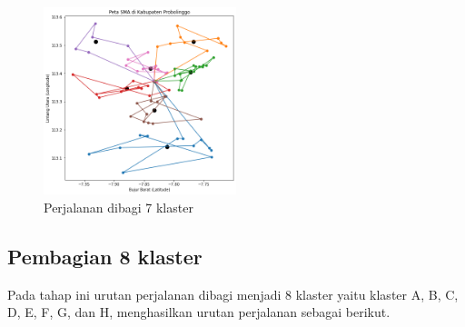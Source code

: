 \begin{figure}[H]
\centering
\includegraphics[width=0.5\textwidth]{Gambar/hasil_mtsp/7}
\caption{Perjalanan dibagi 7 klaster}
\label{fig:hasil_mtsp7}
\end{figure}

\subsection{Pembagian 8 klaster}

\label{pembagian8} Pada tahap ini urutan perjalanan dibagi menjadi 8 klaster yaitu klaster A, B, C, D, E, F, G, dan H, menghasilkan urutan perjalanan sebagai berikut.

